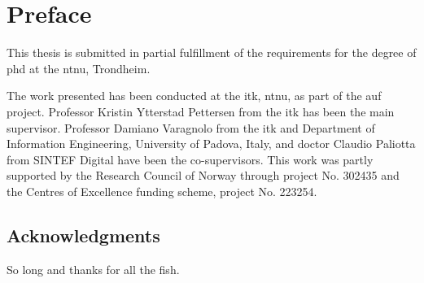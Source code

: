 \chapter*{Preface}

This thesis is submitted in partial fulfillment of the requirements for the degree of \gls{phd} at the \gls{ntnu}, Trondheim.

The work presented has been conducted at the \gls{itk}, \gls{ntnu}, as part of the \gls{auf} project.
Professor Kristin Ytterstad Pettersen from the \gls{itk} has been the main supervisor. 
Professor Damiano Varagnolo from the \gls{itk} and Department of Information Engineering, University of Padova, Italy, and doctor Claudio Paliotta from SINTEF Digital have been the co-supervisors.
This work was partly supported by the Research Council of Norway through project No. 302435 and the Centres of Excellence funding scheme, project No. 223254.

\section*{Acknowledgments}

So long and thanks for all the fish.
